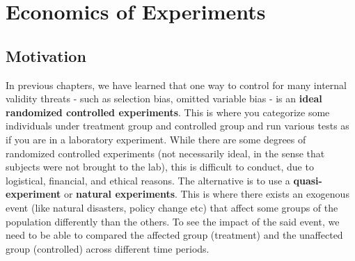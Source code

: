 
\chapter{Economics of Experiments}
\section{Motivation}
In previous chapters, we have learned that one way to control for many internal validity threats - such as selection bias, omitted variable bias - is an \textbf{ideal randomized controlled experiments}. This is where you categorize some individuals under treatment group and controlled group and run various tests as if you are in a laboratory experiment. While there are some degrees of randomized controlled experiments (not necessarily ideal, in the sense that subjects were not brought to the lab), this is difficult to conduct, due to logistical, financial, and ethical reasons. The alternative is to use a \textbf{quasi-experiment} or \textbf{natural experiments}. This is where there exists an exogenous event (like natural disasters, policy change etc) that affect some groups of the population differently than the others.  To see the impact of the said event, we need to be able to compared the affected group (treatment) and the unaffected group (controlled) across different time periods. \par\medskip

